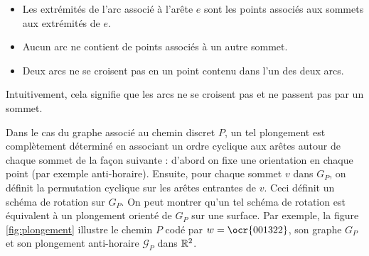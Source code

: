 \begin{itemize}
\item Les extrémités de l'arc associé à l'arête $e$ sont les points associés aux sommets aux extrémités de $e$.
\item Aucun arc ne contient de points associés à un autre sommet.
\item Deux arcs ne se croisent pas en un point contenu dans l'un des deux arcs.
\end{itemize}

Intuitivement, cela signifie que les arcs ne se croisent pas et ne passent pas par un sommet.

Dans le cas du graphe associé au chemin discret $P$, un tel plongement est complètement déterminé en associant un ordre cyclique aux arêtes autour de chaque sommet de la façon suivante : d'abord on fixe une orientation en chaque point (par exemple anti-horaire). Ensuite, pour chaque sommet $v$ dans $G_P$, on définit la permutation cyclique sur les arêtes entrantes de $v$. Ceci définit un schéma de rotation sur $G_P$. On peut montrer qu'un tel schéma de rotation est équivalent à un plongement orienté de $G_P$ sur une surface. Par exemple, la figure \ref{fig:plongement} illustre le chemin $P$ codé par $w=\ocr{001322}$, son graphe $G_P$ et son plongement anti-horaire $\mathcal{G}_P$ dans $\mathbb{R}^2$.


